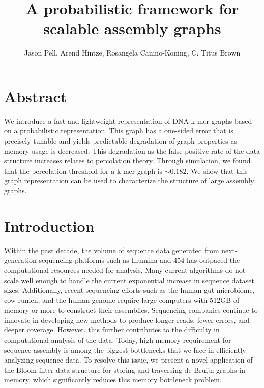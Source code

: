 \documentclass[12pt]{article} \usepackage{simplemargins}
\begin{document}
\title{A probabilistic framework for scalable assembly graphs}
\author{Jason Pell, Arend Hintze, Rosangela Canino-Koning, C. Titus Brown}

\maketitle

\section{Abstract}

We introduce a fast and lightweight representation of DNA k-mer graphs
based on a probabilistic representation.  This graph has a one-sided
error that is precisely tunable and yields predictable degradation of
graph properties as memory usage is decreased. This degradation as the false 
positive rate of the data structure increases relates to percolation theory. Through 
simulation, we found that the percolation threshold for a k-mer graph 
is $\sim 0.182$. We show that this
graph representation can be used to characterize the structure of
large assembly graphs.

\section{Introduction}

Within the past decade, the volume of sequence data generated
from next-generation sequencing platforms such as Illumina and 454
has outpaced the computational resources needed for
analysis. Many current algorithms do not scale well
enough to handle the current exponential increase in sequence dataset
sizes. Additionally, recent sequencing efforts such as the human gut
microbiome\cite{pmid20203603}, cow rumen\cite{pmid21273488}, and the 
human genome\cite{pmid21187386} require large computers with 512GB of memory
or more to construct their
assemblies. 
Sequencing companies continue to innovate in developing new 
methods to produce longer reads, fewer errors, 
and deeper coverage. However, this further contributes to the difficulty in computational 
analysis of the data. Today, high memory requirement for sequence assembly is
among the biggest bottlenecks that we face in efficiently analyzing
sequence data. To resolve this issue, we present a novel application
of the Bloom filter data structure\cite{bloom} for storing and traversing de
Bruijn graphs in memory, which significantly reduces this
memory bottleneck problem.
\end{document}
